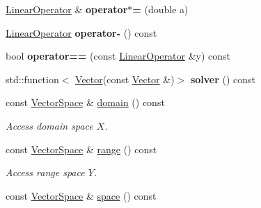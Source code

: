 \begin{DoxyCompactItemize}
\item 
\hyperlink{classSpacy_1_1LinearOperator}{Linear\+Operator} \& {\bfseries operator$\ast$=} (double a)\hypertarget{classSpacy_1_1LinearOperator_a1a337571a68b1c5ece14c637682ac8a4}{}\label{classSpacy_1_1LinearOperator_a1a337571a68b1c5ece14c637682ac8a4}

\item 
\hyperlink{classSpacy_1_1LinearOperator}{Linear\+Operator} {\bfseries operator-\/} () const \hypertarget{classSpacy_1_1LinearOperator_ac77bf18c27c54f2589cfd8ccd6e44dd9}{}\label{classSpacy_1_1LinearOperator_ac77bf18c27c54f2589cfd8ccd6e44dd9}

\item 
bool {\bfseries operator==} (const \hyperlink{classSpacy_1_1LinearOperator}{Linear\+Operator} \&y) const \hypertarget{classSpacy_1_1LinearOperator_afbb3e1bce81ac646081f46fc3688313b}{}\label{classSpacy_1_1LinearOperator_afbb3e1bce81ac646081f46fc3688313b}

\item 
std\+::function$<$ \hyperlink{classSpacy_1_1Vector}{Vector}(const \hyperlink{classSpacy_1_1Vector}{Vector} \&)$>$ {\bfseries solver} () const \hypertarget{classSpacy_1_1LinearOperator_ad460a63d6ad4683a033df2c0688d08ae}{}\label{classSpacy_1_1LinearOperator_ad460a63d6ad4683a033df2c0688d08ae}

\item 
const \hyperlink{classSpacy_1_1VectorSpace}{Vector\+Space} \& \hyperlink{classSpacy_1_1LinearOperator_a1acd2a2f71a95baa2c364b88c4eee126}{domain} () const \hypertarget{classSpacy_1_1LinearOperator_a1acd2a2f71a95baa2c364b88c4eee126}{}\label{classSpacy_1_1LinearOperator_a1acd2a2f71a95baa2c364b88c4eee126}

\begin{DoxyCompactList}\small\item\em Access domain space $X$. \end{DoxyCompactList}\item 
const \hyperlink{classSpacy_1_1VectorSpace}{Vector\+Space} \& \hyperlink{classSpacy_1_1LinearOperator_a29653883e8ebc3460e9294e3bceee5bf}{range} () const \hypertarget{classSpacy_1_1LinearOperator_a29653883e8ebc3460e9294e3bceee5bf}{}\label{classSpacy_1_1LinearOperator_a29653883e8ebc3460e9294e3bceee5bf}

\begin{DoxyCompactList}\small\item\em Access range space $Y$. \end{DoxyCompactList}\item 
const \hyperlink{classSpacy_1_1VectorSpace}{Vector\+Space} \& \hyperlink{classSpacy_1_1LinearOperator_ad0116ec957dfb6bc490a4c9702929f8e}{space} () const \hypertarget{classSpacy_1_1LinearOperator_ad0116ec957dfb6bc490a4c9702929f8e}{}\label{classSpacy_1_1LinearOperator_ad0116ec957dfb6bc490a4c9702929f8e}


\end{DoxyCompactItemize}
